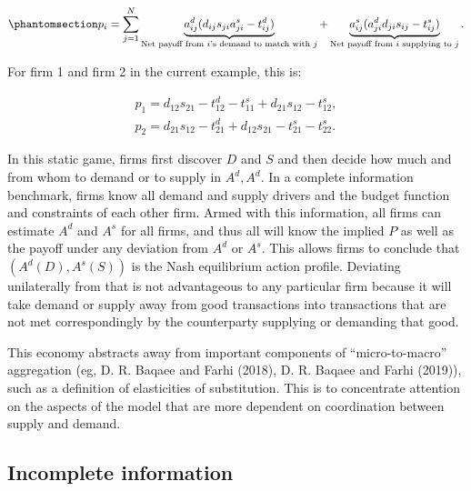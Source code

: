 \documentclass[
]{article}
\theoremstyle{definition}
\theoremstyle{plain}
\theoremstyle{remark}
\begin{document}
\begin{equation}\phantomsection\label{eq-firmlevelpayoff}{
p_i = \sum_{j=1}^N \underbrace{a_{ij}^d (d_{ij} s_{ji} a_{ji}^s - t_{ij}^d)}_{\text{Net payoff from $i$'s demand to match with $j$}} + \underbrace{a_{ij}^s (a_{ji}^d d_{ji} s_{ij} - t_{ij}^s)}_{\text{Net payoff from $i$ supplying to $j$}}.
}\end{equation}

For firm 1 and firm 2 in the current example, this is:

\[
\begin{split}
p_1 = d_{12} s_{21} - t_{12}^d - t_{11}^s + d_{21} s_{12} - t_{12}^s, \\
p_2 = d_{21} s_{12} -t_{21}^d + d_{12} s_{21} - t_{21}^s - t_{22}^s.
\end{split}
\]

In this static game, firms first discover \(D\) and \(S\) and then
decide how much and from whom to demand or to supply in \(A^d, A^d\). In
a complete information benchmark, firms know all demand and supply
drivers and the budget function and constraints of each other firm.
Armed with this information, all firms can estimate \(A^d\) and \(A^s\)
for all firms, and thus all will know the implied \(P\) as well as the
payoff under any deviation from \(A^d\) or \(A^s\). This allows firms to
conclude that \((A^d(D), A^s(S))\) is the Nash equilibrium action
profile. Deviating unilaterally from that is not advantageous to any
particular firm because it will take demand or supply away from good
transactions into transactions that are not met correspondingly by the
counterparty supplying or demanding that good.

This economy abstracts away from important components of
``micro-to-macro'' aggregation (eg, D. R. Baqaee and Farhi (2018), D. R.
Baqaee and Farhi (2019)), such as a definition of elasticities of
substitution. This is to concentrate attention on the aspects of the
model that are more dependent on coordination between supply and demand.

\subsection{Incomplete information}\label{incomplete-information}
\end{document}
